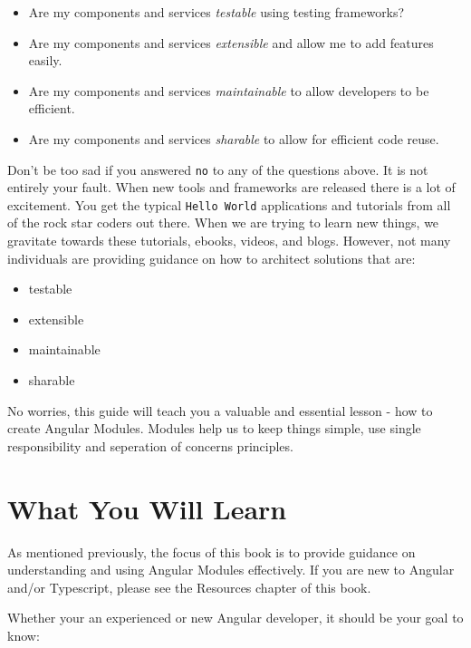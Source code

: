 \documentclass[]{book}
\providecommand{\tightlist}{%
  \setlength{\itemsep}{0pt}\setlength{\parskip}{0pt}}
\theoremstyle{definition}
\theoremstyle{definition}
\theoremstyle{definition}
\theoremstyle{remark}
\begin{document}
\begin{itemize}
\tightlist
\item
  Are my components and services \emph{testable} using testing
  frameworks?
\item
  Are my components and services \emph{extensible} and allow me to add
  features easily.
\item
  Are my components and services \emph{maintainable} to allow developers
  to be efficient.
\item
  Are my components and services \emph{sharable} to allow for efficient
  code reuse.
\end{itemize}

Don't be too sad if you answered \texttt{no} to any of the questions
above. It is not entirely your fault. When new tools and frameworks are
released there is a lot of excitement. You get the typical
\texttt{Hello\ World} applications and tutorials from all of the rock
star coders out there. When we are trying to learn new things, we
gravitate towards these tutorials, ebooks, videos, and blogs. However,
not many individuals are providing guidance on how to architect
solutions that are:

\begin{itemize}
\tightlist
\item
  testable
\item
  extensible
\item
  maintainable
\item
  sharable
\end{itemize}

No worries, this guide will teach you a valuable and essential lesson -
how to create Angular Modules. Modules help us to keep things simple,
use single responsibility and seperation of concerns principles.

\section{What You Will Learn}\label{what-you-will-learn}

As mentioned previously, the focus of this book is to provide guidance
on understanding and using Angular Modules effectively. If you are new
to Angular and/or Typescript, please see the Resources chapter of this
book.

Whether your an experienced or new Angular developer, it should be your
goal to know:
\end{document}
